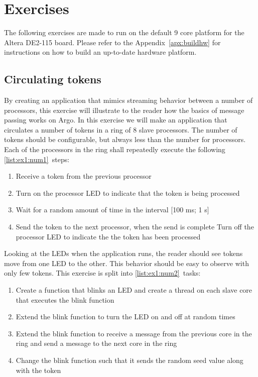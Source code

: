 \documentclass[a4paper,fontsize=10pt,twoside,DIV15,BCOR12mm,headinclude=true,footinclude=false,pagesize,bibtotoc]{scrbook}
\begin{document}
\chapter{Exercises}
\label{chap:exercise}

The following exercises are made to run on the default
9 core platform for the Altera DE2-115 board.
Please refer to the Appendix~\ref{apx:buildhw} for instructions on
how to build an up-to-date hardware platform.

\section{Circulating tokens}
By creating an application that mimics streaming behavior between a number of processors, this exercise will illustrate to the reader how the basics of message passing works on Argo.
In this exercise we will make an application that circulates a number of tokens in a ring of 8 slave processors.
The number of tokens should be configurable, but always less than the number for processors.
Each of the processors in the ring shall repeatedly execute the following \ref{list:ex1:num1}~steps:

\begin{framed}
\begin{enumerate}
\item Receive a token from the previous processor

\item Turn on the processor LED to indicate that the token is being processed

\item Wait for a random amount of time in the interval [100 ms; 1 s]
\label{list:step_rand}
\item Send the token to the next processor, when the send is complete Turn off the processor LED to indicate the the token has been processed

\label{list:ex1:num1}\end{enumerate}
\end{framed}

\noindent Looking at the LEDs when the application runs,
the reader should see tokens move from one LED to the other.
This behavior should be easy to observe with only few tokens.
This exercise is split into \ref{list:ex1:num2}~tasks:
\begin{framed}
\begin{enumerate}
\item Create a function that blinks an LED and create a thread on each slave core that executes the blink function
\item Extend the blink function to turn the LED on and off at random times
\item Extend the blink function to receive a message from the previous core in the ring and send a message to the next core in the ring
\item Change the blink function such that it sends the random seed value along with the token
\label{list:ex1:num2}\end{enumerate}
\end{framed}
\end{document}
